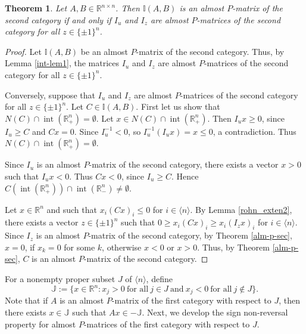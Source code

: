 \documentclass[11pt]{article}
\newtheorem{theorem}{Theorem}[section]
\DeclareMathOperator{\inte }{int}
\begin{document}
\begin{theorem}\label{almst p sec hull}
    Let $A,B \in \mathbb{R}^{n \times n}$. Then $\mathbb{I}(A,B)$ is an almost $P$-matrix of the second category  if and only if $I_u$ and $I_z$ are almost $P$-matrices of the second category for all $z\in \{ \pm 1 \}^n$.
\end{theorem}

\begin{proof}
    Let $\mathbb{I}(A,B)$ be an almost $P$-matrix of the second category.   Thus, by Lemma \ref{int-lem1},  the matrices $I_u$ and $I_z$ are almost $P$-matrices of the second category for all $z\in \{ \pm 1 \}^n$.

    Conversely, suppose that $I_u$ and $I_z$ are almost $P$-matrices of the second category for all $z\in \{ \pm 1 \}^n$. Let $C \in \mathbb{I}(A,B)$. First let us show that $N(C) \cap  \inte (\mathbb{R}_+^n)= \emptyset$. Let $x \in N(C) \cap  \inte (\mathbb{R}_+^n)$. Then $I_ux\geq 0$, since $I_u\geq C$ and $Cx=0$. Since $I^{-1}_u<0$, so $I^{-1}_u(I_ux)=x\leq 0$, a contradiction. Thus $N(C) \cap  \inte (\mathbb{R}_+^n)= \emptyset$.

     Since $I_u$ is an almost $P$-matrix of the second category, there exists a vector $x>0$ such that $I_ux<0$. Thus $Cx<0$, since $I_u\geq C$. Hence $C(\inte (\mathbb{R}_+^n)) \cap \inte (\mathbb{R}_-^n) \neq \emptyset$.

 Let $x \in \mathbb{R}^n$ and  such that $x_i(Cx)_i\leq 0$ for $i \in \langle   n \rangle$. By Lemma \ref{rohn_exten2}, there exists a vector $z\in \{ \pm 1 \}^n$ such that $0\geq x_i (C x)_i \geq x_i(I_z x)_i$ for $i \in \langle   n \rangle$. Since $I_z$ is an almost $P$-matrix of the second category, by Theorem \ref{alm-p-sec}, $x=0$, if $x_k = 0$ for some $k$,  otherwise $x< 0$ or $x>0$. Thus, by Theorem \ref{alm-p-sec}, $C$ is an almost $P$-matrix of the second category.
\end{proof}


For a nonempty proper subset $ J$ of $ \langle n \rangle$, define
\begin{equation}
\mathbb{J} := \{x \in \mathbb{R}^n: x_j > 0  ~\mbox{for all}~ j \in J
~\mbox{and}~ x_j <0 ~\mbox{for all}~ j \notin J  \}.
\end{equation}
Note that if $A$ is an almost $P$-matrix of the first category with respect to $J$, then there exists  $x \in \mathbb{J}$ such that $Ax \in -\mathbb{J}$. Next, we develop the sign non-reversal property for almost $P$-matrices of  the first category with respect to $J$.
\end{document}

